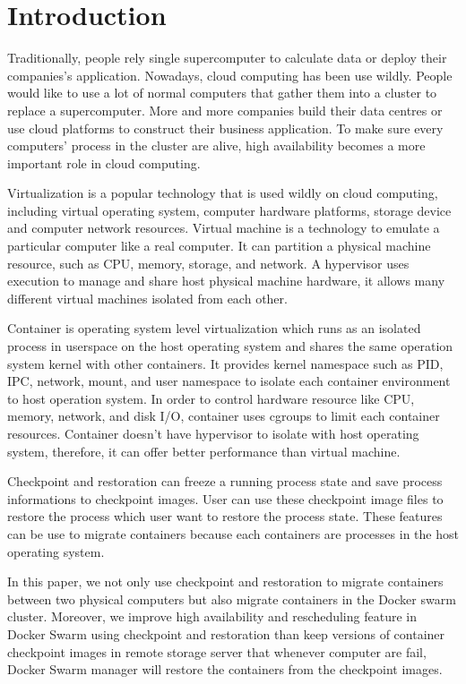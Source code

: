 \chapter{Introduction}
\label{chap:intro}
Traditionally, people rely single supercomputer to calculate data or deploy their companies's application. Nowadays, cloud computing has been use wildly. People would like to use a lot of normal computers that gather them into a cluster to replace a supercomputer. More and more companies build their data centres or use cloud platforms to construct their business application. To make sure every computers' process in the cluster are alive, high availability becomes a more important role in cloud computing.

Virtualization is a popular technology that is used wildly on cloud computing,  including virtual operating system, computer hardware platforms, storage device and computer network resources.
Virtual machine is a technology to emulate a particular computer like a real computer. It can partition a physical machine resource, such as CPU, memory, storage, and network.
A hypervisor uses execution to manage and share host physical machine hardware, it allows many different virtual machines isolated from each other.

Container is operating system level virtualization which runs as an isolated process in userspace on the host operating system and shares the same operation system kernel with other containers.
It provides kernel namespace such as PID, IPC, network, mount, and user namespace to isolate each container environment to host operation system.
In order to control hardware resource like CPU, memory, network, and disk I/O, container uses cgroups to limit each container resources.
Container doesn't have hypervisor to isolate with host operating system, therefore, it can offer better performance than virtual machine.

Checkpoint and restoration can freeze a running process state and save process informations to checkpoint images. User can use these checkpoint image files to restore the process which user want to restore the process state. These features can be use to migrate containers because each containers are processes in the host operating system.

In this paper, we not only use checkpoint and restoration to migrate containers between two physical computers but also migrate containers in the Docker swarm cluster.
Moreover, we improve high availability and rescheduling feature in Docker Swarm using checkpoint and restoration than keep versions of container checkpoint images in remote storage server that whenever computer are fail, Docker Swarm manager will restore the containers from the checkpoint images.